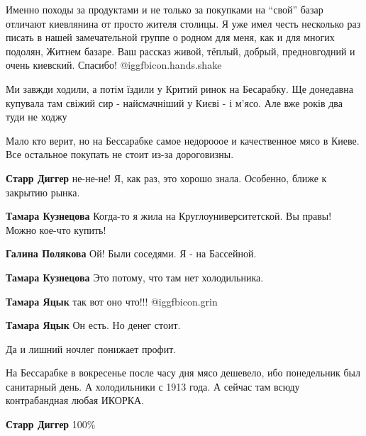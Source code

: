 \begin{itemize}

Именно походы за продуктами и не только за покупками на \enquote{свой} базар отличают
киевлянина от просто жителя столицы. Я уже имел честь несколько раз писать в
нашей замечательной группе о родном для меня, как и для многих подолян, Житнем
базаре. Ваш рассказ живой, тёплый, добрый, предновгодний и очень киевский.
Спасибо! @igg{fbicon.hands.shake} 


Ми завжди ходили, а потім їздили у Критий ринок на Бесарабку. Ще донедавна
купувала там свіжий сир - найсмачніший у Києві - і м'ясо. Але вже років два
туди не ходжу


Мало кто верит, но на Бессарабке самое недорооое и качественное мясо в Киеве.
Все остальное покупать не стоит из-за дороговизны.

\begin{itemize} %
\textbf{Старр Диггер} не-не-не! Я, как раз, это хорошо знала. Особенно, ближе к закрытию рынка.

\begin{itemize} %
\textbf{Тамара Кузнецова} Когда-то я жила на Круглоуниверситетской. Вы правы! Можно кое-что купить!

\textbf{Галина Полякова} Ой! Были соседями. Я - на Бассейной.

\textbf{Тамара Кузнецова} Это потому, что там нет холодильника.

\textbf{Тамара Яцык} так вот оно что!!! @igg{fbicon.grin} 

\textbf{Тамара Яцык} Он есть. Но денег стоит.

Да и лишний ночлег понижает профит.

\end{itemize} %


На Бессарабке в вокресенье после часу дня мясо дешевело, ибо понедельник был
санитарный день. А холодильники с 1913 года. А сейчас там всюду контрабандная
любая ИКОРКА.

\textbf{Старр Диггер}
100\%

\end{itemize} %



\end{itemize}
